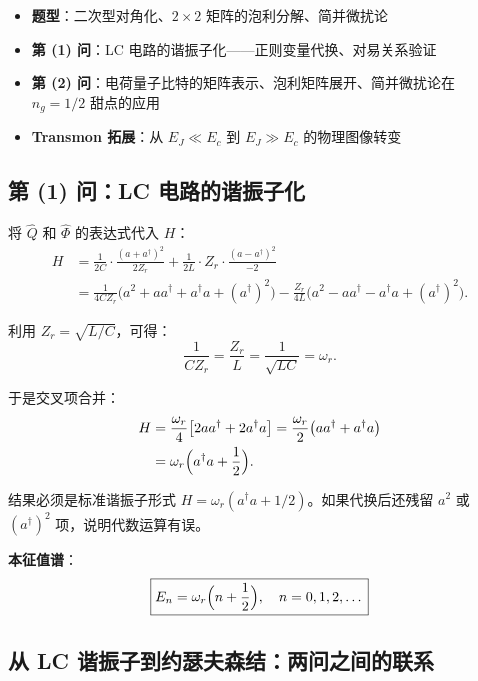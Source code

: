 \begin{insightbox}[核心考点]
\begin{itemize}[nosep]
    \item \textbf{题型}：二次型对角化、$2\times 2$ 矩阵的泡利分解、简并微扰论
    \item \textbf{第 (1) 问}：LC 电路的谐振子化——正则变量代换、对易关系验证
    \item \textbf{第 (2) 问}：电荷量子比特的矩阵表示、泡利矩阵展开、简并微扰论在 $n_g=1/2$ 甜点的应用
    \item \textbf{Transmon 拓展}：从 $E_J \ll E_c$ 到 $E_J \gg E_c$ 的物理图像转变
\end{itemize}
\end{insightbox}

\subsection{第 (1) 问：LC 电路的谐振子化}

将 $\hat{Q}$ 和 $\hat{\Phi}$ 的表达式代入 $H$：
\begin{align*}
H &= \frac{1}{2C} \cdot \frac{(a+a^\dagger)^2}{2Z_r} + \frac{1}{2L} \cdot Z_r \cdot \frac{(a-a^\dagger)^2}{-2} \\
&= \frac{1}{4CZ_r}\bigl(a^2 + aa^\dagger + a^\dagger a + (a^\dagger)^2\bigr) - \frac{Z_r}{4L}\bigl(a^2 - aa^\dagger - a^\dagger a + (a^\dagger)^2\bigr).
\end{align*}

利用 $Z_r = \sqrt{L/C}$，可得：
\[
\frac{1}{CZ_r} = \frac{Z_r}{L} = \frac{1}{\sqrt{LC}} = \omega_r.
\]

于是交叉项合并：
\begin{align*}
H &= \frac{\omega_r}{4}\bigl[2aa^\dagger + 2a^\dagger a\bigr] = \frac{\omega_r}{2}\bigl(aa^\dagger + a^\dagger a\bigr) \\
&= \omega_r\Bigl(a^\dagger a + \frac{1}{2}\Bigr).
\end{align*}

\begin{tipbox}[考场速验]
结果必须是标准谐振子形式 $H = \omega_r(a^\dagger a + 1/2)$。如果代换后还残留 $a^2$ 或 $(a^\dagger)^2$ 项，说明代数运算有误。
\end{tipbox}

\textbf{本征值谱}：
\[
\boxed{E_n = \omega_r\Bigl(n + \frac{1}{2}\Bigr), \quad n = 0, 1, 2, \dots}
\]

\subsection{从 LC 谐振子到约瑟夫森结：两问之间的联系}

